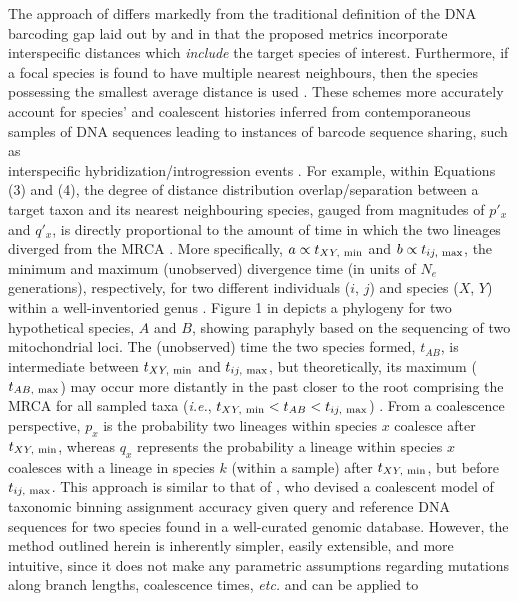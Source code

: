 \documentclass[12pt]{article}
\begin{document}
The approach of \citet{phillips2024measure} differs markedly from the traditional definition of the DNA barcoding gap laid out by \citet{meyer2005dna} and \citet{meier2008use} in that the proposed metrics incorporate interspecific distances which \textit{include} the target species of interest. Furthermore, if a focal species is found to have multiple nearest neighbours, then the species possessing the smallest average distance is used \citep{phillips2024measure}. These schemes more accurately account for species' and coalescent histories inferred from contemporaneous samples of DNA sequences leading to instances of barcode sequence sharing, such as \\ interspecific hybridization/introgression events \citep{phillips2024measure}. For example, within Equations (3) and (4), the degree of distance distribution overlap/separation between a target taxon and its nearest neighbouring species, gauged from magnitudes of $p'_x$ and $q'_x$, is directly proportional to the amount of time in which the two lineages diverged from the MRCA \citep{phillips2024measure}. More specifically, $a \propto t_{XY, \hspace{1mm} \mathrm{min}}$ and $b \propto t_{ij, \hspace{1mm} \mathrm{max}}$, the minimum and maximum (unobserved) divergence time (in units of $N_e$ generations), respectively, for two different individuals ($i$, $j$) and species ($X$, $Y$) within a well-inventoried genus \citep{phillips2024measure}. Figure 1 in \citet{phillips2024measure} depicts a phylogeny for two hypothetical species, $A$ and $B$, showing paraphyly based on the sequencing of two mitochondrial loci. The (unobserved) time the two species formed, $t_{AB}$, is intermediate between $t_{XY, \hspace{1mm} \mathrm{min}}$ and $t_{ij, \hspace{1mm} \mathrm{max}}$, but theoretically, its maximum ($t_{AB, \hspace{1mm} \mathrm{max}}$) may occur more distantly in the past closer to the root comprising the MRCA for all sampled taxa (\textit{i.e.}, $t_{XY, \hspace{1mm} \mathrm{min}} < t_{AB} < t_{ij, \hspace{1mm} \mathrm{max}}$) \citep{phillips2024measure}. From a coalescence perspective, $p_x$ is the probability two lineages within species $x$ coalesce after $t_{XY, \hspace{1mm} \mathrm{min}}$, whereas $q_x$ represents the probability a lineage within species $x$ coalesces with a lineage in species $k$ (within a sample) after $t_{XY, \hspace{1mm} \mathrm{min}}$, but before $t_{ij, \hspace{1mm} \mathrm{max}}$. This approach is similar to that of \citet{desanctis2022theoretical}, who devised a coalescent model of taxonomic binning assignment accuracy given query and reference DNA sequences for two species found in a well-curated genomic database. However,  the method outlined herein is inherently simpler, easily extensible, and more intuitive, since it does not make any parametric assumptions regarding mutations along branch lengths, coalescence times, \textit{etc.} and can be applied to 
\end{document}
